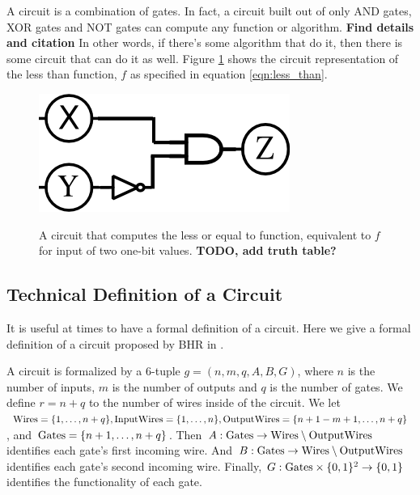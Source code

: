 A circuit is a combination of gates. 
In fact, a circuit built out of only AND gates, XOR gates and NOT gates can compute any function or algorithm.
\textbf{Find details and citation} In other words, if there's some algorithm that do it, then there is some circuit that can do it as well.
Figure \ref{fig:less_than_circuit} shows the circuit representation of the less than function, $f$ as specified in equation \ref{eqn:less_than}.

\begin{figure}[h]
    \centering
    \includegraphics[scale=0.75]{images/drawing.png}
    \label{fig:less_than_circuit}
    \caption{A circuit that computes the less or equal to function, equivalent to $f$ for input of two one-bit values. \textbf{TODO, add truth table?}}
\end{figure}

\subsection{Technical Definition of a Circuit}
It is useful at times to have a formal definition of a circuit.
Here we give a formal definition of a circuit proposed by BHR in \cite{bellare2012foundations}.

A circuit is formalized by a 6-tuple $g = (n,m,q,A,B,G)$, where $n$ is the number of inputs, $m$ is the number of outputs and $q$ is the number of gates.
We define $r = n + q$ to the number of wires inside of the circuit.
We let $\text{Wires} = \{1,\ldots, n+q\}, \text{InputWires} = \{1,\ldots, n\}, \text{OutputWires} = \{n+1-m+1, \ldots,n+q\}$, and $\text{Gates} = \{n+1, \ldots, n+q\}$.
Then $A : \text{Gates} \to \text{Wires} \setminus \text{OutputWires}$ identifies each gate's first incoming wire.
And $B : \text{Gates} \to \text{Wires} \setminus \text{OutputWires}$ identifies each gate's second incoming wire.
Finally, $G: \text{Gates} \times \{0,1\}^2 \to \{0,1\}$ identifies the functionality of each gate.


\newcommand{\Gb}{\operatorname{Gb}}
\newcommand{\En}{\operatorname{En}}
\newcommand{\De}{\operatorname{De}}
\newcommand{\Ev}{\operatorname{Ev}}
\newcommand{\ev}{\operatorname{ev}}
\newcommand{\evcirc}{\ev_{circ}}

